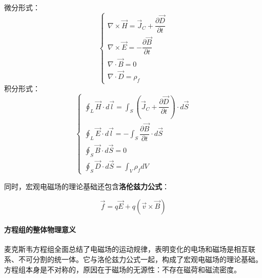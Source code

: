 \begin{formulaBox}
微分形式：
\[
\begin{cases}
\nabla \times \vec{H} = \vec{J}_C + \dfrac{\partial \vec{D}}{\partial t} \\[6pt]
\nabla \times \vec{E} = -\dfrac{\partial \vec{B}}{\partial t} \\[6pt]
\nabla \cdot \vec{B} = 0 \\[6pt]
\nabla \cdot \vec{D} = \rho_f
\end{cases}
\]
积分形式：
\[
\begin{cases}
\displaystyle \oint_{L} \vec{H} \cdot d\vec{l} = \int_{S} \left( \vec{J}_C + \dfrac{\partial \vec{D}}{\partial t} \right) \cdot d\vec{S} \\[6pt]
\displaystyle \oint_{L} \vec{E} \cdot d\vec{l} = -\int_{S} \dfrac{\partial \vec{B}}{\partial t} \cdot d\vec{S} \\[6pt]
\displaystyle \oint_{S} \vec{B} \cdot d\vec{S} = 0 \\[6pt]
\displaystyle \oint_{S} \vec{D} \cdot d\vec{S} = \int_{V} \rho_f dV
\end{cases}
\]
\end{formulaBox}

同时，宏观电磁场的理论基础还包含\textbf{洛伦兹力公式}：
\begin{formulaBox}
\[
\vec{f} = q\vec{E} + q(\vec{v} \times \vec{B})
\]
\end{formulaBox}

\paragraph{方程组的整体物理意义}
麦克斯韦方程组全面总结了电磁场的运动规律，表明变化的电场和磁场是相互联系、不可分割的统一体。它与洛伦兹力公式一起，构成了宏观电磁场的理论基础。方程组本身是不对称的，原因在于磁场的无源性：不存在磁荷和磁流密度。

